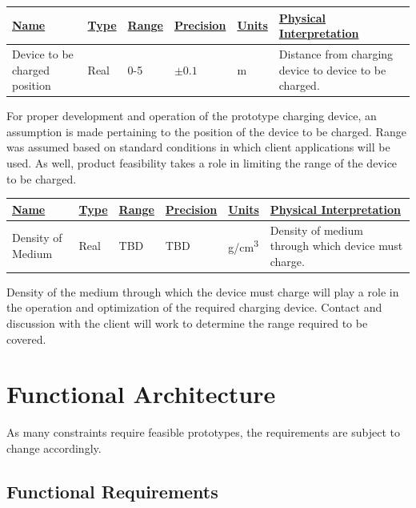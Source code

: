\documentclass[12pt, titlepage]{article}
\begin{document}
\begin{center}
\begin{tabular}{|p{3cm}|p{1cm}|p{1cm}|p{2cm}|p{1cm}|p{6cm}|}
\hline
\underline{Name} & \underline{Type} & \underline{Range} & \underline{Precision} & \underline{Units} & \underline{Physical Interpretation}\\[5pt]
\hline
Device to be charged position & Real & 0-5 & $\pm0.1$ & m & Distance from charging device to device to be charged.\\
\hline
\end{tabular}
\end{center}

For proper development and operation of the prototype charging device, an assumption is made pertaining to the position of the device to be charged. Range was assumed based on standard conditions in which client applications will be used. As well, product feasibility takes a role in limiting the range of the device to be charged. 

\begin{center}
\begin{tabular}{|p{3cm}|p{1cm}|p{1cm}|p{2cm}|p{1cm}|p{6cm}|}
\hline
\underline{Name} & \underline{Type} & \underline{Range} & \underline{Precision} & \underline{Units} & \underline{Physical Interpretation}\\[5pt]
\hline
Density of Medium & Real & TBD & TBD & \si[per-mode=symbol]{\gram\per\centi\meter\cubed} & Density of medium through which device must charge.\\
\hline
\end{tabular}
\end{center}

Density of the medium through which the device must charge will play a role in the operation and optimization of the required charging device. Contact and discussion with the client will work to determine the range required to be covered. 
\section{Functional Architecture}
As many constraints require feasible prototypes, the requirements are subject to change accordingly.
\subsection{Functional Requirements}
\end{document}
